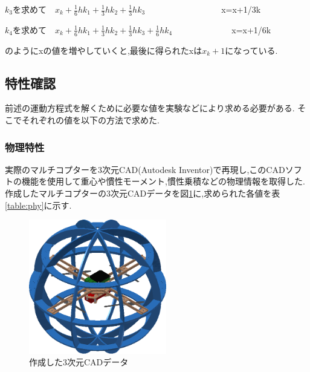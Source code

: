 \documentclass[12pt,oneside]{sotsuken_paper}
\begin{document}
\(k_3\)を求めて　\(x_k+\frac{1}{6}hk_1+\frac{1}{3}hk_2+\frac{1}{3}hk_3\)　　　　　　　　　x=x+1/3k


\(k_4\)を求めて　\(x_k+\frac{1}{6}hk_1+\frac{1}{3}hk_2+\frac{1}{3}hk_3+\frac{1}{6}hk_4\)　　　　　　　x=x+1/6k

のようにxの値を増やしていくと,最後に得られたxは\(x_k+1\)になっている.\cite{runge} 



\subsection{特性確認}
前述の運動方程式を解くために必要な値を実験などにより求める必要がある.
そこでそれぞれの値を以下の方法で求めた.

\subsubsection{物理特性}
実際のマルチコプターを3次元CAD(Autodesk Inventor)で再現し,このCADソフトの機能を使用して重心や慣性モーメント,慣性乗積などの物理情報を取得した.
作成したマルチコプターの3次元CADデータを図\ref{fig:3DCAD}に,求められた各値を表\ref{table:phy}に示す.

\begin{figure}[htbp]
	\begin{center}
		\includegraphics[width=60mm]{image/3DCAD.jpg}
		\caption{作成した3次元CADデータ}
		\label{fig:3DCAD}
	\end{center}
\end{figure}
\end{document}
